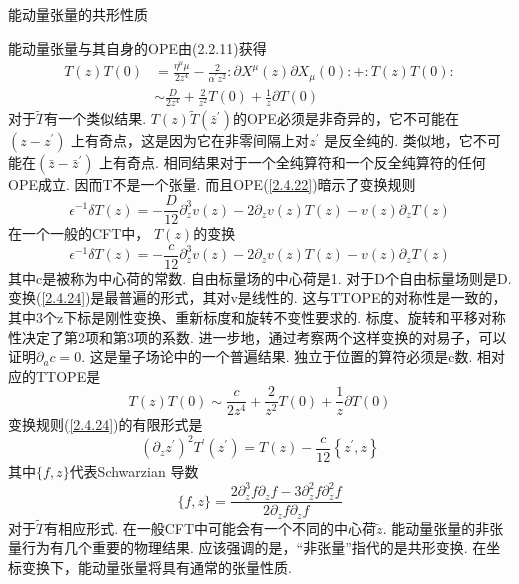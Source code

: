 \centerline{\Large 能动量张量的共形性质}
能动量张量与其自身的OPE由(2.2.11)获得
\begin{equation}\label{2.4.22}
\begin{aligned}
T(z) T(0) &=\frac{\eta^{\mu} \mu}{2 z^{4}}-\frac{2}{\alpha^{\prime} z^{2}}: \partial X^{\mu}(z) \partial X_{\mu}(0):+: T(z) T(0): \\
& \sim \frac{D}{2 z^{4}}+\frac{2}{z^{2}} T(0)+\frac{1}{z} \partial T(0)
\end{aligned}
\end{equation}
对于$\tilde{T}$有一个类似结果. 
$T(z) \tilde{T}\left(\bar{z}^{\prime}\right)$的OPE必须是非奇异的，它不可能在$\left(z-z^{\prime}\right)$ 上有奇点，这是因为它在非零间隔上对$z^{\prime}$ 是反全纯的. 类似地，它不可能在$\left(\bar{z}-\bar{z}^{\prime}\right)$ 上有奇点. 相同结果对于一个全纯算符和一个反全纯算符的任何OPE成立. 因而T不是一个张量. 而且OPE(\ref{2.4.22})暗示了变换规则
\begin{equation}
\epsilon^{-1} \delta T(z)=-\frac{D}{12} \partial_{z}^{3} v(z)-2 \partial_{z} v(z) T(z)-v(z) \partial_{z} T(z)
\end{equation}
在一个一般的CFT中， $T(z)$的变换
\begin{equation}\label{2.4.24}
\epsilon^{-1} \delta T(z)=-\frac{c}{12} \partial_{z}^{3} v(z)-2 \partial_{z} v(z) T(z)-v(z) \partial_{z} T(z)
\end{equation}
其中c是被称为中心荷的常数. 自由标量场的中心荷是1. 对于D个自由标量场则是D. 变换(\ref{2.4.24})是最普遍的形式，其对v是线性的. 这与TTOPE的对称性是一致的，其中3个z下标是刚性变换、重新标度和旋转不变性要求的. 标度、旋转和平移对称性决定了第2项和第3项的系数. 进一步地，通过考察两个这样变换的对易子，可以证明$\partial_{a} c=0$. 这是量子场论中的一个普遍结果. 独立于位置的算符必须是c数. 相对应的TTOPE是
\begin{equation}\label{2.4.25}
T(z) T(0) \sim \frac{c}{2 z^{4}}+\frac{2}{z^{2}} T(0)+\frac{1}{z} \partial T(0)
\end{equation}
变换规则(\ref{2.4.24})的有限形式是
\begin{equation}\label{2.4.26}
\left(\partial_{z} z^{\prime}\right)^{2} T^{\prime}\left(z^{\prime}\right)=T(z)-\frac{c}{12}\left\{z^{\prime}, z\right\}
\end{equation}
其中$\{f,z\}$代表Schwarzian 导数
\begin{equation}
\{f, z\}=\frac{2 \partial_{z}^{3} f \partial_{z} f-3 \partial_{z}^{2} f \partial_{z}^{2} f}{2 \partial_{z} f \partial_{z} f}
\end{equation}
对于$\tilde{T}$有相应形式. 在一般CFT中可能会有一个不同的中心荷$\tilde{z}$.
能动量张量的非张量行为有几个重要的物理结果. 应该强调的是，“非张量”指代的是共形变换. 在坐标变换下，能动量张量将具有通常的张量性质.

